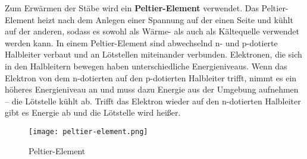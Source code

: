 Zum Erwärmen der Stäbe wird ein \textbf{Peltier-Element} verwendet. Das Peltier-Element heizt nach dem Anlegen einer Spannung auf der einen Seite und kühlt auf der anderen, sodass es sowohl als Wärme- als auch als Kältequelle verwendet werden kann. In einem Peltier-Element sind abwechselnd n- und p-dotierte Halbleiter verbaut und an Lötstellen miteinander verbunden. Elektronen, die sich in den Halbleitern bewegen haben unterschiedliche Energieniveaus. Wenn das Elektron von dem n-dotierten auf den p-dotierten Halbleiter trifft, nimmt es ein höheres Energieniveau an und muss dazu Energie aus der Umgebung aufnehmen -- die Lötstelle kühlt ab. Trifft  das Elektron wieder auf den n-dotierten Halbleiter gibt es Energie ab und die Lötstelle wird heißer.
\begin{figure}
	\centering
\texttt{[image: peltier-element.png]}		
\caption{Peltier-Element\footnotemark}
\end{figure}



